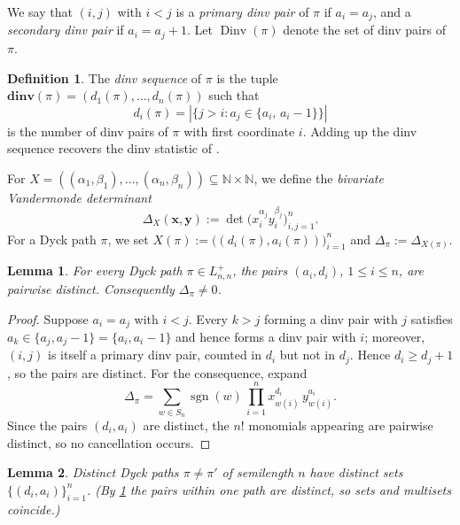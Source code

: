 \documentclass[12pt,reqno]{amsart}
\newtheorem{lem}{Lemma}
\theoremstyle{definition}
\newtheorem{definition}{Definition}
\newcommand{\N}{\mathbb N}
\newcommand{\x}{\mathbf x}
\newcommand{\y}{\mathbf y}
\newcommand{\ddinv}{\mathbf{dinv}}
\DeclareMathOperator{\Dinv}{Dinv}
\DeclareMathOperator{\sgn}{sgn}
\begin{document}
We say that $(i,j)$ with $i < j$ is a \emph{primary dinv pair} of $\pi$ if $a_i = a_j$, and a \emph{secondary dinv pair} if $a_i = a_j + 1$. Let $\Dinv(\pi)$ denote the set of dinv pairs of $\pi$.

\begin{definition}\label{def:dinv}
The \emph{dinv sequence} of $\pi$ is the tuple $\ddinv(\pi) = (d_1(\pi),\dots,d_n(\pi))$ such that
\begin{equation}\label{eq:count}
d_i(\pi) = |\{j > i : a_j \in \{a_i,\, a_i - 1\}\}|
\end{equation}
is the number of dinv pairs of $\pi$ with first coordinate $i$. Adding up the dinv sequence recovers the dinv statistic of \cite{MR2371044}.
\end{definition}

For $X = ((\alpha_1,\beta_1),\dots,(\alpha_n,\beta_n)) \subseteq \N \times \N$, we define the \emph{bivariate Vandermonde determinant}
\[
\Delta_X(\x,\y) := \det\bigl(x_i^{\alpha_j} y_i^{\beta_j}\bigr)_{i,j=1}^n.
\]
For a Dyck path $\pi$, we set $X(\pi) := \bigl((d_i(\pi), a_i(\pi))\bigr)_{i=1}^n$ and $\Delta_\pi := \Delta_{X(\pi)}$.

\begin{lem}\label{lem:distinct}
For every Dyck path $\pi \in L_{n,n}^+$, the pairs $(a_i, d_i)$, $1 \leq i \leq n$, are pairwise distinct. Consequently $\Delta_\pi \neq 0$.
\end{lem}

\begin{proof}
Suppose $a_i = a_j$ with $i < j$. Every $k > j$ forming a dinv pair with $j$ satisfies $a_k \in \{a_j, a_j - 1\} = \{a_i, a_i - 1\}$ and hence forms a dinv pair with $i$; moreover, $(i,j)$ is itself a primary dinv pair, counted in $d_i$ but not in $d_j$. Hence $d_i \geq d_j + 1$, so the pairs are distinct. For the consequence, expand
\[
\Delta_\pi = \sum_{w \in S_n} \sgn(w)\, \prod_{i=1}^n x_{w(i)}^{d_i}\, y_{w(i)}^{a_i}.
\]
Since the pairs $(d_i, a_i)$ are distinct, the $n!$ monomials appearing are pairwise distinct, so no cancellation occurs.
\end{proof}

\begin{lem}\label{lem:injective}
Distinct Dyck paths $\pi \neq \pi'$ of semilength $n$ have distinct sets $\{(d_i, a_i)\}_{i=1}^n$. (By \cref{lem:distinct} the pairs within one path are distinct, so sets and multisets coincide.)
\end{lem}
\end{document}
